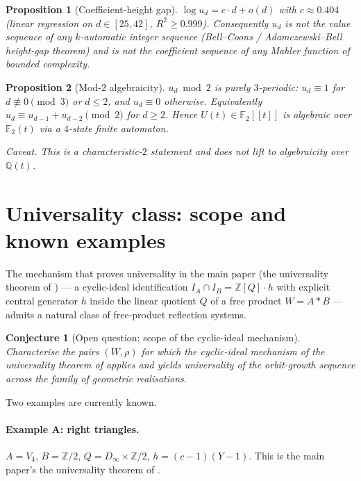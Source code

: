 \documentclass[11pt,a4paper]{article}
\newtheorem{conjecture}{Conjecture}
\newtheorem{proposition}{Proposition}
\theoremstyle{remark}
\theoremstyle{plain}
\begin{document}
\begin{proposition}[Coefficient-height gap]
\label{prop:height-gap}
$\log u_d = c \cdot d + o(d)$ with $c \approx 0.404$ (linear regression
on $d \in [25, 42]$, $R^2 \ge 0.999$).  Consequently $u_d$ is not the
value sequence of any $k$-automatic integer sequence (Bell--Coons /
Adamczewski--Bell height-gap theorem) and is not the coefficient
sequence of any Mahler function of bounded complexity.
\end{proposition}

\begin{proposition}[Mod-$2$ algebraicity]
\label{prop:mod2-automaton}
$u_d \bmod 2$ is purely $3$-periodic: $u_d \equiv 1$ for $d \not\equiv 0 \pmod 3$
or $d \le 2$, and $u_d \equiv 0$ otherwise.  Equivalently
$u_d \equiv u_{d-1} + u_{d-2} \pmod 2$ for $d \ge 2$.  Hence
$U(t) \in \mathbb{F}_2[[t]]$ is algebraic over $\mathbb{F}_2(t)$ via a
$4$-state finite automaton.

\emph{Caveat.}  This is a characteristic-$2$ statement and does not
lift to algebraicity over $\mathbb{Q}(t)$.
\end{proposition}

\section{Universality class: scope and known examples}
\label{sec:universality-class}

The mechanism that proves universality in the main paper
(the universality theorem of \cite{Bonfioli2}) --- a cyclic-ideal identification
$I_A \cap I_B = \mathbb{Z}[Q]\cdot h$ with explicit central generator
$h$ inside the linear quotient $Q$ of a free product $W = A * B$ ---
admits a natural class of free-product reflection systems.

\begin{conjecture}[Open question: scope of the cyclic-ideal mechanism]
\label{conj:universality-class}
Characterise the pairs $(W, \rho)$ for which the cyclic-ideal mechanism
of the universality theorem of \cite{Bonfioli2} applies and yields universality of
the orbit-growth sequence across the family of geometric realisations.
\end{conjecture}

Two examples are currently known.

\paragraph{Example A: right triangles.}  $A = V_4$, $B = \mathbb{Z}/2$,
$Q = D_\infty \times \mathbb{Z}/2$, $h = (c-1)(Y-1)$.  This is the main
paper's the universality theorem of \cite{Bonfioli2}.
\end{document}
